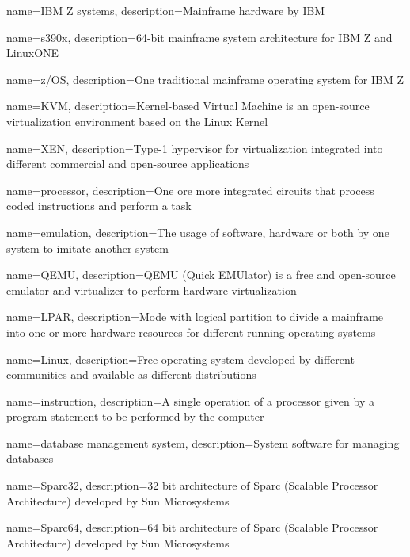 {
    name={IBM Z systems},
    description={Mainframe hardware by IBM}
}

{
    name={s390x},
    description={64-bit mainframe system architecture for IBM Z and LinuxONE}
}

{
    name={z/OS},
    description={One traditional mainframe operating system for IBM Z}
}

{
    name={KVM},
    description={Kernel-based Virtual Machine is an open-source virtualization environment based on the Linux Kernel}
}

{
    name={XEN},
    description={Type-1 hypervisor for virtualization integrated into different commercial and open-source applications}
}

{
    name={processor},
    description={One ore more integrated circuits that process coded instructions and perform a task}
}

{
    name={emulation},
    description={The usage of software, hardware or both by one system to imitate another system}
}

{
    name={QEMU},
    description={QEMU (Quick EMUlator) is a free and open-source emulator and virtualizer to perform hardware virtualization}
}

{
    name={LPAR},
    description={Mode with logical partition to divide a mainframe into one or more hardware resources for different running operating systems}
}

{
    name={Linux},
    description={Free operating system developed by different communities and available as different distributions}
}

{
    name={instruction},
    description={A single operation of a processor given by a program statement to be performed by the computer}
}

{
    name={database management system},
    description={System software for managing databases}
}

{
    name={Sparc32},
    description={32 bit architecture of Sparc (Scalable Processor Architecture) developed by Sun Microsystems}
}

{
    name={Sparc64},
    description={64 bit architecture of Sparc (Scalable Processor Architecture) developed by Sun Microsystems}
}

